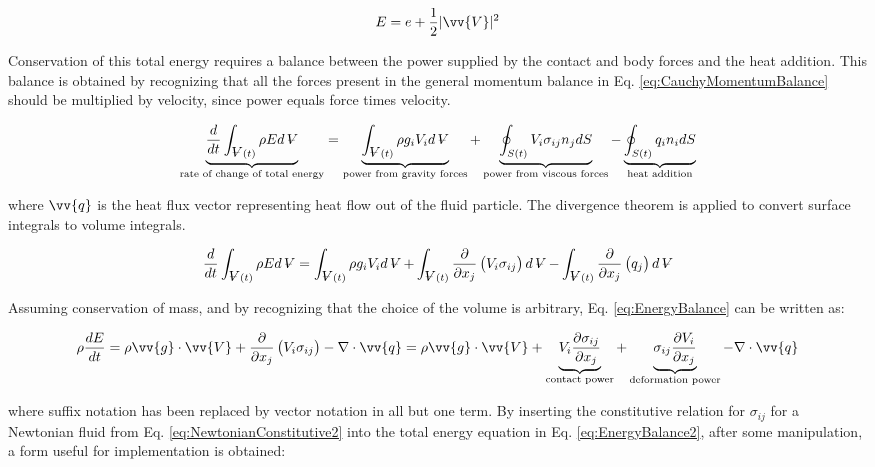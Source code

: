\documentclass[10pt]{article}
\newcommand{\volume}{\mathop{\ooalign{\hfil$V$\hfil\cr\kern0.08em--\hfil\cr}}\nolimits}
\numberwithin{equation}{section} %
\begin{document}
\begin{equation}
\label{eq:TotalEnergy}
E=e+\frac{1}{2}|\vv{V}|^2
\end{equation}

Conservation of this total energy requires a balance between the power supplied by the contact and body forces and the heat addition. This balance is obtained by recognizing that all the forces present in the general momentum balance in Eq. \eqref{eq:CauchyMomentumBalance} should be multiplied by velocity, since power equals force times velocity.

\begin{equation}
\label{eq:EnergyBalance1}
\underbrace{\frac{d}{dt}\int_{\volume(t)}^{}\rho Ed\volume}_\text{rate of change of total energy}=\underbrace{\int_{\volume(t)}^{}\rho g_iV_id\volume}_\text{power from gravity forces}+\underbrace{\oint_{S(t)}^{}V_i\sigma_{ij}n_jdS}_\text{power from viscous forces}-\underbrace{\oint_{S(t)}^{}q_in_idS}_\text{heat addition}
\end{equation}

where \(\vv{q}\) is the heat flux vector representing heat flow out of the fluid particle. The divergence theorem is applied to convert surface integrals to volume integrals.

\begin{equation}
\label{eq:EnergyBalance}
\frac{d}{dt}\int_{\volume(t)}^{}\rho Ed\volume=\int_{\volume(t)}^{}\rho g_iV_id\volume+\int_{\volume(t)}^{}\frac{\partial}{\partial x_j}\left(V_i\sigma_{ij}\right)d\volume-\int_{\volume(t)}^{}\frac{\partial}{\partial x_j}\left(q_j\right)d\volume
\end{equation}

Assuming conservation of mass, and by recognizing that the choice of the volume is arbitrary, Eq. \eqref{eq:EnergyBalance} can be written as:

\begin{equation}
\label{eq:EnergyBalance2}
\rho\frac{dE}{dt}=\rho \vv{g}\cdot\vv{V}+\frac{\partial}{\partial x_j}\left(V_i\sigma_{ij}\right)-\nabla\cdot\vv{q}=\rho \vv{g}\cdot\vv{V}+\underbrace{V_i\frac{\partial\sigma_{ij}}{\partial x_j}}_\text{contact power}+\underbrace{\sigma_{ij}\frac{\partial V_i}{\partial x_j}}_\text{deformation power}-\nabla\cdot\vv{q}
\end{equation}

where suffix notation has been replaced by vector notation in all but one term. By inserting the constitutive relation for \(\sigma_{ij}\) for a Newtonian fluid from Eq. \eqref{eq:NewtonianConstitutive2} into the total energy equation in Eq. \eqref{eq:EnergyBalance2}, after some manipulation, a form useful for implementation is obtained:
\end{document}
